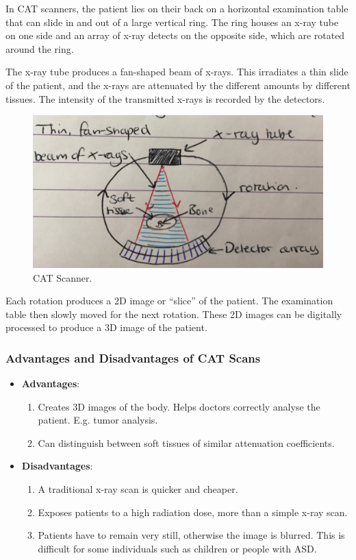 In CAT scanners, the patient lies on their back on a horizontal examination table that can slide in and out of a large vertical ring. The ring houses an x-ray tube on one side and an array of x-ray detects on the opposite side, which are rotated around the ring. 

The x-ray tube produces a fan-shaped beam of x-rays. This irradiates a thin slide of the patient, and the x-rays are attenuated by the different amounts by different tissues. The intensity of the transmitted x-rays is recorded by the detectors.

\begin{figure}[h!]
    \centering
    \includegraphics[scale=0.1]{notes/images/CAT-Scanner.JPG}
    \caption{CAT Scanner.}
\end{figure}
\FloatBarrier

Each rotation produces a 2D image or ``slice'' of the patient. The examination table then slowly moved for the next rotation. These 2D images can be digitally processed to produce a 3D image of the patient. 

\subsubsection*{Advantages and Disadvantages of CAT Scans}
\begin{itemize}
    \item \textbf{Advantages}:
    \begin{enumerate}
        \item Creates 3D images of the body. Helps doctors correctly analyse the patient. E.g. tumor analysis.
        \item Can distinguish between soft tissues of similar attenuation coefficients.
    \end{enumerate}
    \item \textbf{Disadvantages}:
    \begin{enumerate}
        \item A traditional x-ray scan is quicker and cheaper.
        \item Exposes patients to a high radiation dose, more than a simple x-ray scan.
        \item Patients have to remain very still, otherwise the image is blurred. This is difficult for some individuals such as children or people with ASD.
    \end{enumerate}
\end{itemize}


